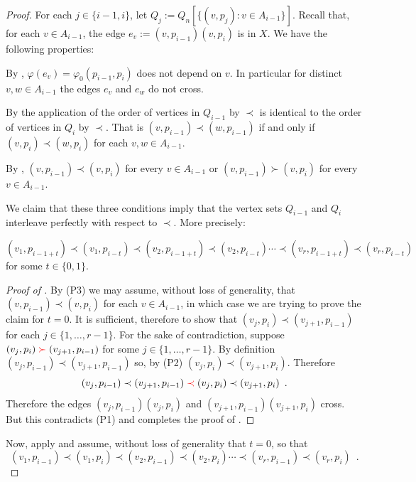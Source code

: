 \documentclass[kpfonts]{patmorin}
\begin{document}
\begin{proof}
    For each $j\in\{i-1,i\}$, let $Q_j:=Q_n[\{(v,p_j):v\in A_{i-1}\}]$.
    Recall that, for each $v\in A_{i-1}$, the edge $e_v:=(v,p_{i-1})(v,p_i)$ is in $X$.  We have the following properties:
    \begin{compactenum}[(P1)]
        \item By , $\varphi(e_v)=\varphi_0(p_{i-1},p_i)$ does not depend on $v$.  In particular for distinct $v,w\in A_{i-1}$ the edges $e_v$ and $e_w$ do not cross.
        \item By the application of  the order of vertices in $Q_{i-1}$ by $\prec$ is identical to the order of vertices in $Q_i$ by $\prec$.  That is $(v,p_{i-1})\prec (w,p_{i-1})$ if and only if $(v,p_{i})\prec (w,p_{i})$ for each $v,w\in A_{i-1}$.
        \item By , $(v,p_{i-1})\prec (v,p_i)$ for every $v\in A_{i-1}$ or $(v,p_{i-1})\succ (v,p_i)$ for every $v\in A_{i-1}$.
    \end{compactenum}
    We claim that these three conditions imply that the vertex sets $Q_{i-1}$ and $Q_{i}$ interleave perfectly with respect to $\prec$. More precisely:
	\begin{clm} $(v_1,p_{i-1+t})\prec (v_1,p_{i-t}) \prec (v_2,p_{i-1+t}) \prec (v_2,p_{i-t}) \cdots \prec (v_r,p_{i-1+t}) \prec (v_r,p_{i-t})$ for some $t\in\{0,1\}$.
	\end{clm}
	\begin{proof}[Proof of ]
		By (P3) we may assume, without loss of generality, that $(v,p_{i-1})\prec (v,p_i)$ for each $v\in A_{i-1}$, in which case we are trying to prove the claim for $t=0$.  It is sufficient, therefore to show that $(v_j,p_i)\prec (v_{j+1},p_{i-1})$ for each $j\in\{1,\ldots,r-1\}$.  For the sake of contradiction, suppose $(v_j,p_{i}){\color{red}{}\succ{}} (v_{j+1},p_{i-1})$ for some $j\in\{1,\ldots,r-1\}$. By definition $(v_j,p_{i-1})\prec (v_{j+1},p_{i-1})$ so, by (P2)  $(v_{j},p_i) \prec (v_{j+1},p_i)$.  Therefore
		\[
			(v_j,p_{i-1})\prec (v_{j+1},p_{i-1}) {\color{red}{}\prec{}} (v_{j},p_i) \prec
		   (v_{j+1}, p_i) \enspace .
	   	\]
		Therefore the edges $(v_j,p_{i-1})(v_j,p_{i})$ and $(v_{j+1},p_{i-1})(v_{j+1},p_i)$ cross.  But this contradicts (P1) and completes the proof of .
	\end{proof}

	Now, apply  and assume, without loss of generality that $t=0$, so that
	\[
		(v_1,p_{i-1})\prec (v_1,p_{i}) \prec (v_2,p_{i-1}) \prec (v_2,p_{i}) \cdots \prec (v_r,p_{i-1}) \prec (v_r,p_{i}) \enspace .
	\]


\end{proof}
\end{document}
